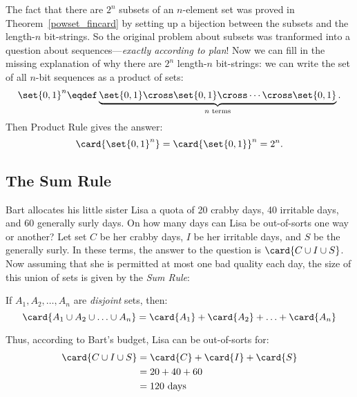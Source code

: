 The fact that there are $2^n$ subsets of an $n$-element set was proved
in Theorem~\ref{powset_fincard} by setting up a bijection between the
subsets and the length-$n$ bit-strings.  So the original problem about
subsets was tranformed into a question about sequences---\emph{exactly
  according to plan}!  Now we can fill in the missing explanation of
why there are $2^n$ length-$n$ bit-strings: \iffalse Now if we answer
the sequence question, then we've solved our original problem as well.

But how many different $n$-bit sequences are there?  For example,
there are 8 different 3-bit sequences:
%
\[
\begin{array}{ccccccc}
(0,0,0) & \quad & (0,0,1) & \quad & (0,1,0) & \quad & (0,1,1) \\
(1,0,0) & \quad & (1,0,1) & \quad & (1,1,0) & \quad & (1,1,1)
\end{array}
\]

Well,\fi
we can write the set of all $n$-bit sequences as a product of
sets:
%
\[
\set{0,1}^n \eqdef \underbrace{\set{0,1} \cross \set{0,1} \cross
        \cdots \cross \set{0,1}}_{\text{$n$ terms}}.
\]
%
Then Product Rule gives the answer:
%
\[
\card{\set{0,1}^n} = \card{\set{0,1}}^n  = 2^n.
\]


\iffalse
This means that the number of subsets of an $n$-element set $X$ is
also $2^n$.  We'll put this answer to use shortly.
\fi

\subsection{The Sum Rule}

Bart allocates his little sister Lisa a quota of 20 crabby days, 40
irritable days, and 60 generally surly days.  On how many days can
Lisa be out-of-sorts one way or another?  Let set $C$ be her crabby
days, $I$ be her irritable days, and $S$ be the generally surly.  In
these terms, the answer to the question is $\card{C \cup I \cup S}$.
Now assuming that she is permitted at most one bad quality each day,
the size of this union of sets is given by the \emph{Sum Rule}:%

\begin{rul}\label{rul:sum}
If $A_1, A_2, \ldots, A_n$ are \emph{disjoint} sets, then:
%
\[
\card{A_1 \cup A_2 \cup \ldots \cup A_n}
    = \card{A_1} + \card{A_2} + \ldots + \card{A_n}
\]
\end{rul}

Thus, according to Bart's budget, Lisa can be out-of-sorts for:
%
\begin{align*}
\card{C \cup I \cup S}
    & = \card{C} + \card{I} + \card{S} \\
    & = 20 + 40 + 60 \\
    & = 120 \text{ days}
\end{align*}

